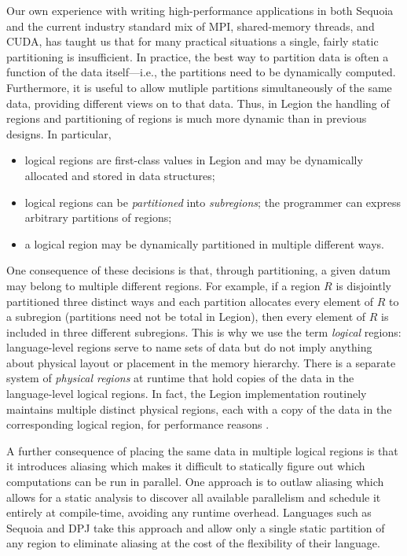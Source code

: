 Our own experience with writing high-performance applications in both 
Sequoia and the current industry standard mix of MPI, shared-memory
threads, and CUDA, has taught us that for many practical situations a
single, fairly static partitioning is insufficient.  In practice, the
best way to partition data is often a function of the data
itself---i.e., the partitions need to be dynamically computed.
Furthermore, it is useful to allow mutliple partitions simultaneously of
the same data, providing different views on to that data. Thus, in Legion the 
handling of regions and partitioning of regions is much more dynamic than in 
previous designs.  In particular,
\begin{itemize}
\item  logical regions are first-class values in Legion
and may be dynamically allocated and stored in data structures;

\item logical regions can be {\em partitioned} into {\em subregions}; the programmer can express arbitrary partitions of
regions;

\item  a logical region may be dynamically partitioned in multiple different ways.
\end{itemize}
One consequence of these decisions is that, through partitioning, a
given datum may belong to multiple different regions.  For example, if
a region $R$ is disjointly partitioned three distinct ways 
and each partition allocates every element of $R$ to a
subregion (partitions need not be total in Legion), then every element
of $R$ is included in three different subregions.  This is why we use
the term {\em logical} regions: language-level regions serve to name
sets of data but do not imply anything about physical layout or placement
in the memory hierarchy.  There
is a separate system of {\em physical regions} at runtime that hold
copies of the data in the language-level logical regions.  In fact,
the Legion implementation routinely maintains multiple distinct
physical regions, each with a copy of the data in the corresponding
logical region, for performance reasons \cite{Legion12}.

A further consequence of placing the same data in multiple logical
regions is that it introduces aliasing which makes it difficult 
to statically figure out which computations can be run in parallel.  
One approach is to outlaw aliasing which allows for a static analysis
to discover all available parallelism and schedule it entirely at
compile-time, avoiding any runtime overhead.  Languages such as
Sequoia and DPJ take this approach and allow only a single static partition of any region 
to eliminate aliasing at the cost of the flexibility of their language.

